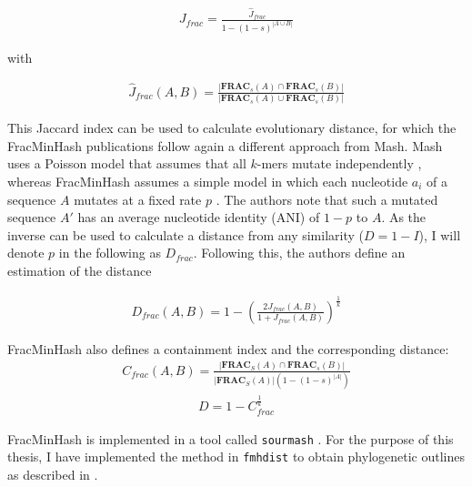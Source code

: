 \begin{align}
  J_{frac} = \frac{\hat{J}_{frac}}{1 - (1 - s)^{|A \cup B|}}
\end{align}

with

\begin{align}
  \hat{J}_{frac}(A, B) = \frac{|\mathbf{FRAC}_s(A) \cap \mathbf{FRAC}_s(B)|}{|\mathbf{FRAC}_s(A) \cup \mathbf{FRAC}_s(B)|}  
\end{align}

This Jaccard index can be used to calculate evolutionary distance, for which the
FracMinHash publications follow again a different approach from Mash. Mash uses
a Poisson model that assumes that all $k$-mers mutate independently
\cite{ondovMashFastGenome2016,heraDebiasingFracMinHashDeriving2023,fanAssemblyAlignmentfreeMethod2015},
whereas FracMinHash assumes a simple model in which each nucleotide $a_i$ of a
sequence $A$ mutates at a fixed rate $p$
\cite{heraDebiasingFracMinHashDeriving2023}. The authors note that such a
mutated sequence $A'$ has an average nucleotide identity (ANI) of $1-p$ to $A$.
As the inverse can be used to calculate a distance from any similarity ($D = 1 -
I$), I will denote $p$ in the following as $D_{frac}$. Following this, the
authors define an estimation of the distance 

\begin{align}
  D_{frac}(A, B) = 1 - (\frac{2J_{frac}(A,B)}{1+J_{frac}(A, B)})^{\frac{1}{k}}
\end{align}

FracMinHash also defines a containment index and the corresponding distance:
\begin{align}
  C_{frac}(A, B) = \frac{|\mathbf{FRAC}_S(A) \cap \mathbf{FRAC}_s(B)|}{|\mathbf{FRAC}_S(A)| (1-(1-s)^{|A|})}
\end{align}
\begin{align}
  D=1-C_{frac}^{\frac{1}{k}}
\end{align}

FracMinHash is implemented in a tool called \texttt{sourmash}
\cite{irberLightweightCompositionalAnalysis2022,irberDecentralizingIndicesGenomic2020}.
For the purpose of this thesis, I have implemented the method in
\texttt{fmhdist} to obtain phylogenetic outlines as described in
\cite{bagciMicrobialPhylogeneticContext2021}.
